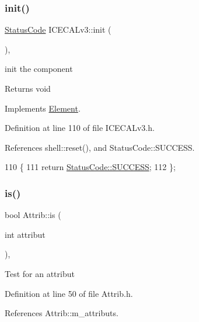 \subsubsection{\texorpdfstring{init()}{init()}}
{\footnotesize\ttfamily \hyperlink{classStatusCode}{Status\+Code} I\+C\+E\+C\+A\+Lv3\+::init (\begin{DoxyParamCaption}{ }\end{DoxyParamCaption})\hspace{0.3cm}{\ttfamily [inline]}, {\ttfamily [virtual]}}

init the component

\begin{DoxyReturn}{Returns}
void 
\end{DoxyReturn}


Implements \hyperlink{classElement_af42754b5cabc198869222725218d695c}{Element}.



Definition at line 110 of file I\+C\+E\+C\+A\+Lv3.\+h.



References shell\+::reset(), and Status\+Code\+::\+S\+U\+C\+C\+E\+SS.


\begin{DoxyCode}
110                     \{
111     \textcolor{keywordflow}{return} \hyperlink{classStatusCode_a6f565cbeadc76d14c72f047e5e85eb4badd0da38d3ba0d922efd1f4619bc37ad8}{StatusCode::SUCCESS};
112   \};
\end{DoxyCode}
\mbox{\label{classAttrib_a704f26af560909ad22065083bb7d4c34}} 
\subsubsection{\texorpdfstring{is()}{is()}}
{\footnotesize\ttfamily bool Attrib\+::is (\begin{DoxyParamCaption}\item[{int}]{attribut }\end{DoxyParamCaption})\hspace{0.3cm}{\ttfamily [inline]}, {\ttfamily [inherited]}}

Test for an attribut 

Definition at line 50 of file Attrib.\+h.



References Attrib\+::m\+\_\+attributs.



